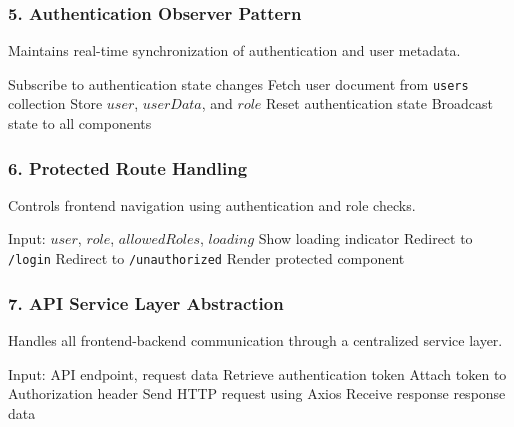 \documentclass[conference]{IEEEtran}
\begin{document}
\vspace{0.5cm}

\subsubsection{5. Authentication Observer Pattern}
Maintains real-time synchronization of authentication and user metadata.

\begin{algorithm}
\caption{Auth State Synchronization}
\begin{algorithmic}[1]
\STATE Subscribe to authentication state changes
    \STATE Fetch user document from \texttt{users} collection
    \STATE Store $user$, $userData$, and $role$
\ELSE
    \STATE Reset authentication state
\ENDIF
\STATE Broadcast state to all components
\end{algorithmic}
\end{algorithm}

\vspace{0.5cm}

\subsubsection{6. Protected Route Handling}
Controls frontend navigation using authentication and role checks.

\begin{algorithm}
\caption{Declarative Route Guarding}
\begin{algorithmic}[1]
\STATE Input: $user$, $role$, $allowedRoles$, $loading$
    \STATE Show loading indicator
    \STATE Redirect to \texttt{/login}
    \STATE Redirect to \texttt{/unauthorized}
\ELSE
    \STATE Render protected component
\ENDIF
\end{algorithmic}
\end{algorithm}

\vspace{0.5cm}

\subsubsection{7. API Service Layer Abstraction}
Handles all frontend-backend communication through a centralized service layer.

\begin{algorithm}
\caption{API Request Handling}
\begin{algorithmic}[1]
\STATE Input: API endpoint, request data
\STATE Retrieve authentication token
\STATE Attach token to Authorization header
\STATE Send HTTP request using Axios
\STATE Receive response
\STATE \RETURN response data
\end{algorithmic}
\end{algorithm}
\end{document}
